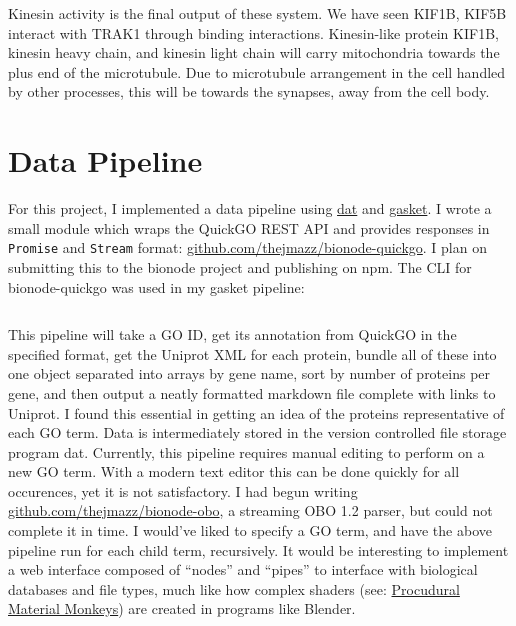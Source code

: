 Kinesin activity is the final output of these system. We have seen KIF1B, KIF5B
interact with TRAK1 through binding interactions. Kinesin-like protein KIF1B,
kinesin heavy chain, and kinesin light chain will carry mitochondria towards
the plus end of the microtubule. Due to microtubule arrangement in the cell
handled by other processes, this will be towards the synapses, away from the
cell body.

\section{Data Pipeline}

For this project, I implemented a data pipeline using
\href{http://dat-data.com}{dat} and
\href{https://github.com/datproject/gasket}{gasket}. I wrote a small module
which wraps the QuickGO REST API and provides responses in \texttt{Promise} and
\texttt{Stream} format:
\href{https://github.com/thejmazz/bionode-quickgo}{github.com/thejmazz/bionode-quickgo}.
I plan on submitting this to the bionode project and publishing on npm. The CLI
for bionode-quickgo was used in my gasket pipeline:

\inputminted[fontsize=\small]{json}{"../gasket.json"}

This pipeline will take a GO ID, get its annotation from QuickGO in the
specified format, get the Uniprot XML for each protein, bundle all of these into
one object separated into arrays by gene name, sort by number of proteins per
gene, and then output a neatly formatted markdown file complete with links to
Uniprot. I found this essential in getting an idea of the proteins
representative of each GO term. Data is intermediately stored in the version
controlled file storage program dat. Currently, this pipeline requires manual
editing to perform on a new GO term. With a modern text editor this can be done
quickly for all occurences, yet it is not satisfactory. I had begun writing
\href{https://github.com/thejmazz/bionode-obo}{github.com/thejmazz/bionode-obo},
a streaming OBO 1.2 parser, but could not complete it in time. I would've liked
to specify a GO term, and have the above pipeline run for each child term,
recursively. It would be interesting to implement a web interface composed of
``nodes'' and ``pipes'' to interface with biological databases and file types,
much like how complex shaders (see: \href{http://imgur.com/a/CQUIL}{Procudural
Material Monkeys}) are created in programs like Blender.





